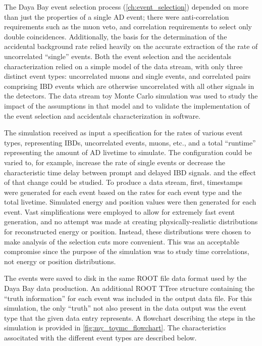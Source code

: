 The Daya Bay event selection process (\cref{ch:event_selection})
depended on more than just the properties of a single AD event;
there were anti-correlation requirements such as the muon veto,
and correlation requirements to select only double coincidences.
Additionally, the basis for the determination of the accidental background rate
relied heavily on the accurate extraction of
the rate of uncorrelated ``single'' events.
Both the event selection and the accidentals characterization
relied on a simple model of the data stream,
with only three distinct event types:
uncorrelated muons and single events,
and correlated pairs comprising IBD events
which are otherwise uncorrelated with all other signals in the detectors.
The data stream toy Monte Carlo simulation was used
to study the impact of the assumptions in that model
and to validate the implementation of
the event selection and accidentals characterization
in software.

The simulation received as input
a specification for the rates of various event types,
representing IBDs, uncorrelated events, muons, etc.,
and a total ``runtime'' representing the amount of AD livetime to simulate.
The configuration could be varied to, for example,
increase the rate of single events
or decrease the characteristic time delay between prompt and delayed IBD signals.
and the effect of that change could be studied.
To produce a data stream,
first, timestamps were generated for each event
based on the rates for each event type and the total livetime.
Simulated energy and position values were then generated for each event.
Vast simplifications were employed to allow for
extremely fast event generation,
and no attempt was made at creating
physically-realistic distributions for
reconstructed energy or position.
Instead, these distributions were chosen to make analysis
of the selection cuts more convenient.
This was an acceptable compromise since the purpose of the simulation
was to study time correlations, not energy or position distributions.

The events were saved to disk in the same ROOT file data format
used by the Daya Bay data production.
An additional ROOT TTree structure containing the ``truth information''
for each event was included in the output data file.
For this simulation, the only ``truth'' not also present in the data output
was the event type that the given data entry represents.
A flowchart describing the steps in the simulation
is provided in \cref{fig:my_toymc_flowchart}.
The characteristics associtated with the different event types
are described below.

